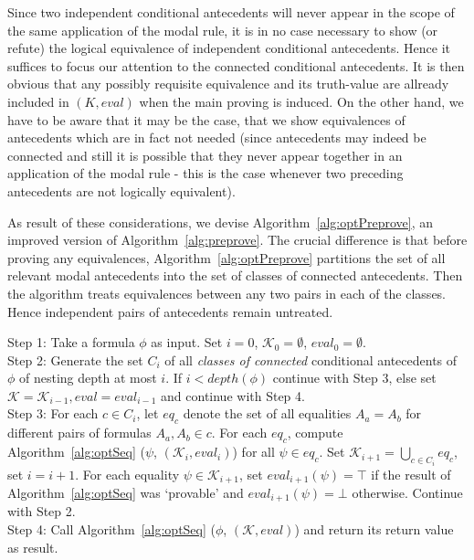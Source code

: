 \documentclass{entcs} \usepackage{entcsmacro}
\newcommand{\eval}{\mathit{eval}}
\begin{document}
Since two independent conditional antecedents will never appear in the scope of the
same application of the modal rule, it is in no case necessary to show (or
refute) the logical equivalence of independent conditional antecedents. Hence it suffices to focus
our attention to the connected conditional antecedents. It is then obvious that
any possibly requisite equivalence and its truth-value are allready included in $(K,\eval)$
when the main proving is induced. On the other hand, we have to be aware that it
may be the case, that we show equivalences of antecedents which are in fact not needed
(since antecedents may indeed be connected and still it is possible that they never appear together in an application
of the modal rule - this is the case whenever two preceding antecedents are not logically equivalent).

As result of these considerations, we devise Algorithm~\ref{alg:optPreprove},
an improved version of Algorithm~\ref{alg:preprove}. The crucial difference is
that before proving any equivalences, Algorithm~\ref{alg:optPreprove} partitions the
set of all relevant modal antecedents into the set of classes of connected antecedents.
Then the algorithm treats equivalences between any two pairs in each of the classes.
Hence independent pairs of antecedents remain untreated.
\begin{alg}
\begin{upshape}
  Step 1: Take a formula $\phi$ as input. Set $i=0$, $\mathcal{K}_0=\emptyset$, $\eval_0=\emptyset$.\\
  Step 2: Generate the set $C_i$ of all \emph{classes of connected} conditional antecedents of $\phi$
  of nesting depth at most $i$. If $i<depth(\phi)$ continue
  with Step 3, else set $\mathcal{K}=\mathcal{K}_{i-1}, \eval=\eval_{i-1}$ and continue with Step 4.\\
  Step 3: For each $c\in C_i$, let $eq_{c}$ denote the set of all equalities $A_a = A_b$ for different
  pairs of formulas $A_a,A_b\in c$. For each $eq_{c}$, compute
  Algorithm~\ref{alg:optSeq} ($\psi$, $(\mathcal{K}_i,\eval_i)$) for all $\psi\in eq_{c}$.
  Set $\mathcal{K}_{i+1} = \bigcup_{c\in C_i} eq_{c}$, set $i = i + 1$. For each equality $\psi\in\mathcal{K}_{i+1}$,
  set $\eval_{i+1}(\psi)=\top$ if the result of Algorithm~\ref{alg:optSeq} was `provable'
  and $\eval_{i+1}(\psi)=\bot$ otherwise. Continue with Step 2.\\
  Step 4: Call Algorithm~\ref{alg:optSeq} ($\phi$, $(\mathcal{K},\eval)$) and return its 
  return value as result.
\label{alg:optPreprove}
\end{upshape}
\end{alg}
\end{document}
